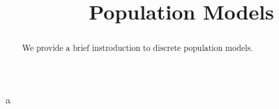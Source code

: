 \documentclass{ximera}
\title{Population Models}
\begin{document}
  
\begin{abstract}  
We provide a brief instroduction to discrete population models.
\end{abstract}  
\maketitle

\section{}

a
\end{document}
